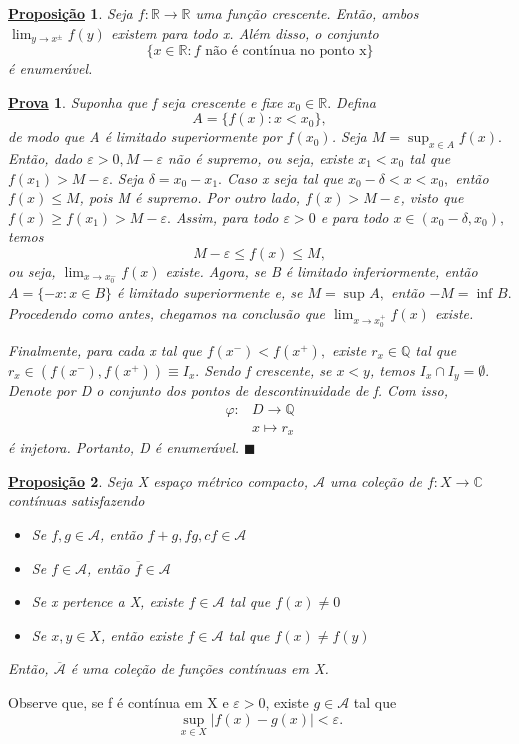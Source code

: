\documentclass{article}
\newtheorem*{prop*}{\underline{Proposi\c c\~ao}}
\newtheorem*{proof*}{\underline{Prova}}
\renewcommand\qedsymbol{$\blacksquare$}
\begin{document}
\begin{prop*}
	Seja \(f:\mathbb{R}\rightarrow \mathbb{R}\) uma função crescente. Então, ambos \(\lim_{y\to x^{\pm}}f(y)\) existem para todo x. Além disso, o conjunto
	\[
		\{x\in \mathbb{R}: f \text{ não é contínua no ponto x}\}
	\]
	é enumerável.
\end{prop*}
\begin{proof*}
	Suponha que f seja crescente e fixe \(x_{0}\in \mathbb{R}.\) Defina
	\[
		A = \{f(x): x < x_{0}\},
	\]
	de modo que A é limitado superiormente por \(f(x_{0})\). Seja \(M = \sup_{x\in A}f(x).\) Então, dado \(\varepsilon > 0, M - \varepsilon \) não é supremo, ou seja,
	existe \(x_{1} < x_{0}\) tal que \(f(x_{1}) > M - \varepsilon .\) Seja \(\delta  = x_{0} - x_{1}.\) Caso x seja tal que \(x_{0} - \delta < x < x_{0},\) então \(f(x) \leq M\), pois
	M é supremo. Por outro lado, \(f(x) > M - \varepsilon \), visto que \(f(x) \geq f(x_{1}) > M - \varepsilon .\) Assim, para todo \(\varepsilon > 0\) e para todo \(x\in (x_{0}-\delta , x_{0}),\) temos
	\[
		M - \varepsilon \leq f(x) \leq M,
	\]
	ou seja, \(\lim_{x\to x_{0}^{-}}f(x)\) existe.
	Agora, se B é limitado inferiormente, então \(A = \{-x: x\in B\}\) é limitado superiormente e, se \(M = \sup_{}A,\) então \(-M = \inf_{}B.\) Procedendo como antes, chegamos na conclusão
	que \(\lim_{x\to x_{0}^{+}}f(x)\) existe.

	Finalmente, para cada x tal que \(f(x^{-}) < f(x^{+}),\) existe \(r_{x}\in \mathbb{Q}\) tal que \(r_{x}\in (f(x^{-}), f(x^{+}))\equiv I_{x}.\) Sendo f crescente, se \(x < y\), temos
	\(I_{x}\cap I_{y} = \emptyset.\) Denote por D o conjunto dos pontos de descontinuidade de f. Com isso,
	\begin{align*}
		\varphi : & D\rightarrow \mathbb{Q} \\
		          & x \mapsto r_{x}
	\end{align*}
	é injetora. Portanto, D é enumerável. \qedsymbol
\end{proof*}
\begin{prop*}
	Seja X espaço métrico compacto, \(\mathcal{A}\) uma coleção de \(f:X\rightarrow \mathbb{C}\) contínuas satisfazendo
	\begin{itemize}
		\item[i)] Se \(f, g\in \mathcal{A}\), então \(f + g, fg, cf\in \mathcal{A}\)
		\item[ii)] Se \(f\in \mathcal{A}\), então \(\overline{f}\in \mathcal{A}\)
		\item[iii)] Se x pertence a X, existe \(f\in \mathcal{A}\) tal que \(f(x)\neq 0\)
		\item[iv)] Se \(x, y\in X\), então existe \(f\in \mathcal{A}\) tal que \(f(x)\neq f(y)\)
	\end{itemize}
	Então, \(\overline{\mathcal{A}}\) é uma coleção de funções contínuas em X.
\end{prop*}
Observe que, se f é contínua em X e \(\varepsilon > 0\), existe \(g\in \mathcal{A}\) tal que
\[
	\sup_{x\in X}|f(x) - g(x)| < \varepsilon.
\]
\end{document}
